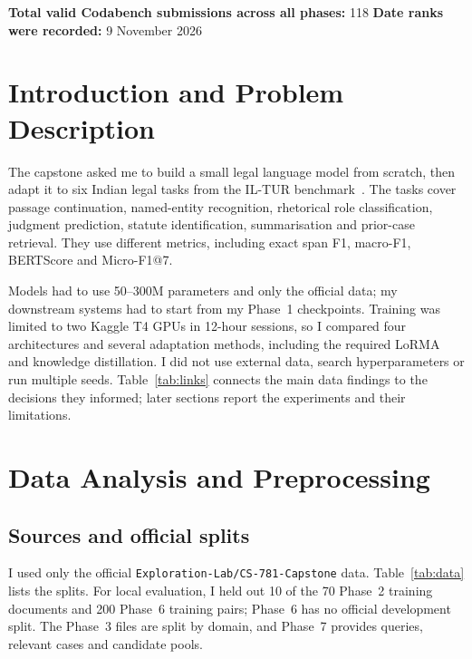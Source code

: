 \documentclass[11pt, oneside]{article}
\begin{document}
\noindent
\textbf{Total valid Codabench submissions across all phases:} 118
\quad
\textbf{Date ranks were recorded:} 9 November 2026


\section{Introduction and Problem Description}
The capstone asked me to build a small legal language model from scratch, then adapt it to six Indian legal tasks
from the IL-TUR benchmark~\cite{iltur}. The tasks cover passage continuation, named-entity recognition, rhetorical
role classification, judgment prediction, statute identification, summarisation and prior-case retrieval. They use
different metrics, including exact span F1, macro-F1, BERTScore and Micro-F1@7.

Models had to use 50--300M parameters and only the official data; my downstream systems had to start from my Phase~1
checkpoints. Training was limited to two Kaggle T4 GPUs in 12-hour sessions, so I compared four architectures and
several adaptation methods, including the required LoRMA~\cite{lorma} and knowledge distillation. I did not use
external data, search hyperparameters or run multiple seeds. Table~\ref{tab:links} connects the main data findings
to the decisions they informed; later sections report the experiments and their limitations.

\section{Data Analysis and Preprocessing}
\subsection{Sources and official splits}
I used only the official \texttt{Exploration-Lab/CS-781-Capstone} data. Table~\ref{tab:data} lists the splits.
For local evaluation, I held out 10 of the 70 Phase~2 training documents and 200 Phase~6 training pairs; Phase~6
has no official development split. The Phase~3 files are split by domain, and Phase~7 provides queries, relevant
cases and candidate pools.
\end{document}
